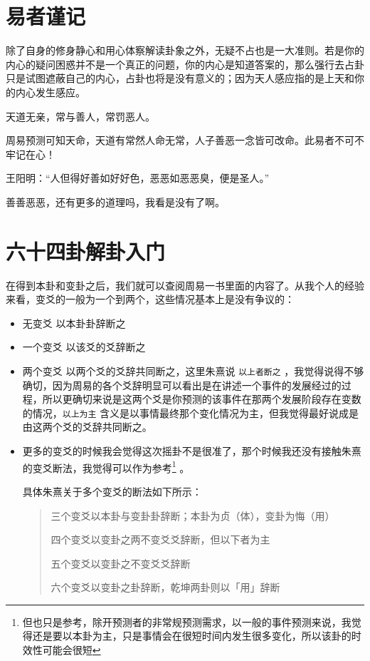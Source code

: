 \documentclass[12pt,oneside]{book}
\begin{document}
\section{易者谨记}
除了自身的修身静心和用心体察解读卦象之外，无疑不占也是一大准则。若是你的内心的疑问困惑并不是一个真正的问题，你的内心是知道答案的，那么强行去占卦只是试图遮蔽自己的内心，占卦也将是没有意义的；因为天人感应指的是上天和你的内心发生感应。

天道无亲，常与善人，常罚恶人。

周易预测可知天命，天道有常然人命无常，人子善恶一念皆可改命。此易者不可不牢记在心！

王阳明：“人但得好善如好好色，恶恶如恶恶臭，便是圣人。”

善善恶恶，还有更多的道理吗，我看是没有了啊。





\section{六十四卦解卦入门}
在得到本卦和变卦之后，我们就可以查阅周易一书里面的内容了。从我个人的经验来看，变爻的一般为一个到两个，这些情况基本上是没有争议的：

\begin{itemize}
\item 无变爻 以本卦卦辞断之
\item 一个变爻 以该爻的爻辞断之
\item 两个变爻 以两个爻的爻辞共同断之，这里朱熹说 \verb+以上者断之+ ，我觉得说得不够确切，因为周易的各个爻辞明显可以看出是在讲述一个事件的发展经过的过程，所以更确切来说是这两个爻是你预测的该事件在那两个发展阶段存在变数的情况，\verb+以上为主+ 含义是以事情最终那个变化情况为主，但我觉得最好说成是由这两个爻的爻辞共同断之。
\item 更多的变爻的时候我会觉得这次摇卦不是很准了，那个时候我还没有接触朱熹的变爻断法，我觉得可以作为参考\footnote{但也只是参考，除开预测者的非常规预测需求，以一般的事件预测来说，我觉得还是要以本卦为主，只是事情会在很短时间内发生很多变化，所以该卦的时效性可能会很短} 。

具体朱熹关于多个变爻的断法如下所示：
\begin{quotation}
三个变爻以本卦与变卦卦辞断；本卦为贞（体），变卦为悔（用）

四个变爻以变卦之两不变爻爻辞断，但以下者为主

五个变爻以变卦之不变爻爻辞断

六个变爻以变卦之卦辞断，乾坤两卦则以「用」辞断
\end{quotation}

\end{itemize}
\end{document}

